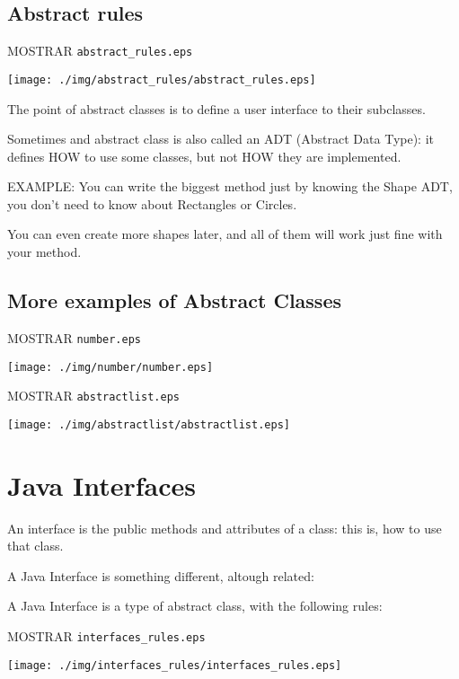 \documentclass[a4paper, 9pt]{extarticle}
\begin{document}
\subsection{Abstract rules}

MOSTRAR \verb+abstract_rules.eps+
\begin{center}
  \texttt{[image: ./img/abstract\_rules/abstract\_rules.eps]}
\end{center}

The point of abstract classes is to define a user interface to their subclasses.

Sometimes and abstract class is also called an ADT (Abstract Data Type): it
defines HOW to use some classes, but not HOW they are implemented.

EXAMPLE: You can write the biggest method just by knowing the Shape ADT, you
don't need to know about Rectangles or Circles.

You can even create more shapes later, and all of them will work just fine with
your method.




\subsection{More examples of Abstract Classes}

MOSTRAR \verb+number.eps+
\begin{center}
  \texttt{[image: ./img/number/number.eps]}
\end{center}

MOSTRAR \verb+abstractlist.eps+
\begin{center}
  \texttt{[image: ./img/abstractlist/abstractlist.eps]}
\end{center}


\section{Java Interfaces}

An interface is the public methods and attributes of a class: this is, how to
use that class.

A Java Interface is something different, altough related:

A Java Interface is a type of abstract class, with the following rules:

MOSTRAR \verb+interfaces_rules.eps+
\begin{center}
  \texttt{[image: ./img/interfaces\_rules/interfaces\_rules.eps]}
\end{center}
\end{document}
